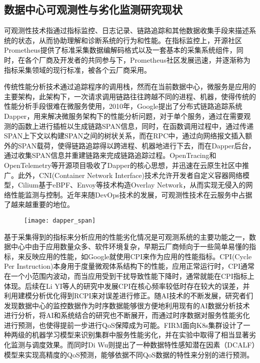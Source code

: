 \subsection{数据中心可观测性与劣化监测研究现状}


可观测性技术指通过指标监控、日志记录、链路追踪和其他数据收集手段来描述系统的状态，从而协助理解和诊断系统的行为和性能。在指标监控上，开源社区Prometheus\citep{brazil2018prometheus}提供了标准采集数据编解码格式以及一套基本的采集系统组件，同时，在各个厂商及开发者的共同参与下，Prometheus社区发展迅速，并逐渐称为指标采集领域的现行标准，被各个云厂商采用。

传统性能分析技术通过追踪程序的调用栈，然而在当前数据中心，微服务是应用的主要架构，此架构下，一次请求调用链路往往跨越不同的进程、机器，使得传统的性能分析手段很难在微服务使用，2010年，Google提出了分布式链路追踪系统Dapper\citep{sigelman2010dapper}，用来解决微服务架构下的性能分析问题，对于单个服务，通过在需要观测的函数上进行插桩以生成链路SPAN信息，同时，在函数调用过程中，通过传递SPAN上下文以构建SPAN之间的树状关系，而在RPC中，通过向网络报文插入额外的SPAN载荷，使得链路追踪得以跨进程、机器地进行下去，而在Dapper后台，通过收集SPAN信息并重建链路来完成链路追踪过程。OpenTracing和OpenTelemetry等开源项目吸收了Dapper的核心思想，并迅速在云原生社区中推广。此外，CNI(Container Network Interface)\citep{k8s-network-plugins}技术允许开发者自定义容器网络模型，Cilium\citep{cilium}基于eBPF、Envoy等技术\citep{ebpf,envoyproxy}构造Overlay Network，从而实现无侵入的网络性能监测与控制。近年来随DevOps技术的发展，可观测性技术在云服务中占据了越来越重要的地位。

\begin{figure}[H]
    \centering
    \texttt{[image: dapper\_span]}
    \label{fig:parties_app_dif}
\end{figure}

基于采集得到的指标来分析应用的性能劣化情况是可观测系统的主要功能之一，数据中心中由于应用数量众多、软件环境复杂，早期云厂商倾向于一些简单易懂的指标，来反映应用的性能，如Google就使用CPI\citep{zhang2013cpi2}来作为应用的性能指标。CPI(Cycle Per Instruction)本身用于度量微观体系结构下的性能，应用正常运行时，CPI通常在一个小范围内波动，而当应用受到干扰导致性能下降时，通常就能在CPI指标上体现。后续在Li YI等人的研究中\citep{yi2020cpi}发展CPI在核心频率较低时存在较大的误差，并利用建模分析优化得到RCPI来对误差进行修正。随AI技术的不断发展，研究者们发现数据中心的监控数据作为时序数据能够很方便地利用现有的AI数据分析技术进行分析，将AI和系统结合的研究也不断展开，而通过时序数据对服务性能劣化进行预测\citep{qiu2020firm, zhou2022aquatope, wang2022deepscaling, gan2021sage, ghafouri2020survey,zheng2020web,wu2019posterior}，也使得提前一步进行QoS保障成为可能。FIRM\citep{qiu2020firm}面向K8s集群设计了一种两级的机器学习模型来识别集群中服务性能劣化，并在实验中取得了相当显著劣化监测与调度效果。而同时Di Wu\citep{wu2020data}则提出了一种数据特性感知潜在因素（DCALF）模型来实现高精度的QoS预测，能够依据不同QoS数据的特性来分别的进行预测。

